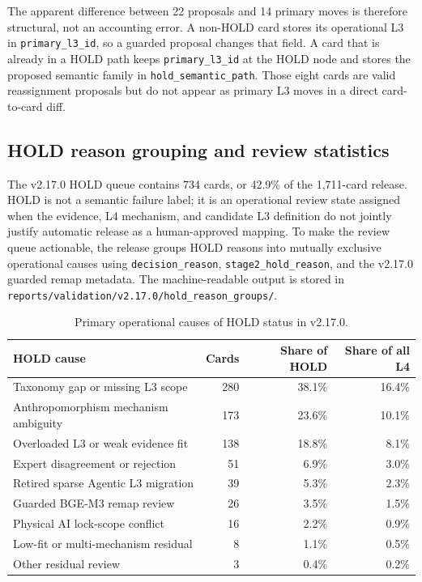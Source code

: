 \documentclass[11pt,a4paper]{article}
\newcommand{\code}[1]{\texttt{#1}}
\begin{document}
The apparent difference between 22 proposals and 14 primary moves is therefore
structural, not an accounting error. A non-HOLD card stores its operational L3
in \code{primary\_l3\_id}, so a guarded proposal changes that field. A card
that is already in a HOLD path keeps \code{primary\_l3\_id} at the HOLD node
and stores the proposed semantic family in \code{hold\_semantic\_path}. Those
eight cards are valid reassignment proposals but do not appear as primary L3
moves in a direct card-to-card diff.


\subsection{HOLD reason grouping and review statistics}

The v2.17.0 HOLD queue contains 734 cards, or 42.9\% of the 1,711-card
release. HOLD is not a semantic failure label; it is an operational review
state assigned when the evidence, L4 mechanism, and candidate L3 definition do
not jointly justify automatic release as a human-approved mapping. To make the
review queue actionable, the release groups HOLD reasons into mutually
exclusive operational causes using \code{decision\_reason},
\code{stage2\_hold\_reason}, and the v2.17.0 guarded remap metadata. The
machine-readable output is stored in
\code{reports/validation/v2.17.0/hold\_reason\_groups/}.

\begin{table}[ht]
\centering
\caption{Primary operational causes of HOLD status in v2.17.0.}
\label{tab:hold-reason-groups-v217}
\begin{tabular}{lrrr}
\toprule
HOLD cause & Cards & Share of HOLD & Share of all L4 \\
\midrule
Taxonomy gap or missing L3 scope & 280 & 38.1\% & 16.4\% \\
Anthropomorphism mechanism ambiguity & 173 & 23.6\% & 10.1\% \\
Overloaded L3 or weak evidence fit & 138 & 18.8\% & 8.1\% \\
Expert disagreement or rejection & 51 & 6.9\% & 3.0\% \\
Retired sparse Agentic L3 migration & 39 & 5.3\% & 2.3\% \\
Guarded BGE-M3 remap review & 26 & 3.5\% & 1.5\% \\
Physical AI lock-scope conflict & 16 & 2.2\% & 0.9\% \\
Low-fit or multi-mechanism residual & 8 & 1.1\% & 0.5\% \\
Other residual review & 3 & 0.4\% & 0.2\% \\
\bottomrule
\end{tabular}
\end{table}
\end{document}

